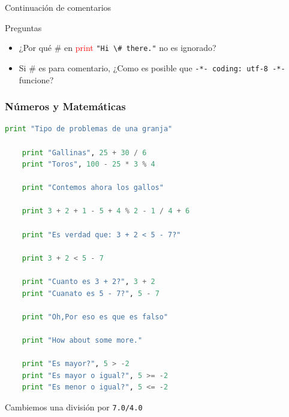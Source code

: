 \documentclass[]{beamer}
\begin{document}
\begin{frame}[fragile]{Continuación de comentarios}
	\begin{block}{Preguntas}
		\begin{itemize}
			\item ¿Por qué \# en \textcolor{red}{print} \verb|"Hi \# there."| no es ignorado?
			\item Si \# es para comentario, ¿Como es posible que \verb|-*- coding: utf-8 -*-| funcione?
		\end{itemize}
	\end{block}
\end{frame}

\begin{frame}
	\frametitle{Números y Matemáticas}
	\begin{lstlisting}[language=Python,inputencoding=utf8, 
	basicstyle=\ttfamily\small, 
	keywordstyle=\color{keywords},
	commentstyle=\color{comments},
	stringstyle=\color{red},
	showstringspaces=false,
	identifierstyle=\color{green},caption= Problema de granja]
	print "Tipo de problemas de una granja"
	
	print "Gallinas", 25 + 30 / 6
	print "Toros", 100 - 25 * 3 % 4
	
	print "Contemos ahora los gallos"
	
	print 3 + 2 + 1 - 5 + 4 % 2 - 1 / 4 + 6
	
	print "Es verdad que: 3 + 2 < 5 - 7?"
	
	print 3 + 2 < 5 - 7
	
	print "Cuanto es 3 + 2?", 3 + 2
	print "Cuanato es 5 - 7?", 5 - 7
	
	print "Oh,Por eso es que es falso"
	
	print "How about some more."
	
	print "Es mayor?", 5 > -2
	print "Es mayor o igual?", 5 >= -2
	print "Es menor o igual?", 5 <= -2
	\end{lstlisting}
	Cambiemos una división por \verb|7.0/4.0|
\end{frame}
\end{document}
